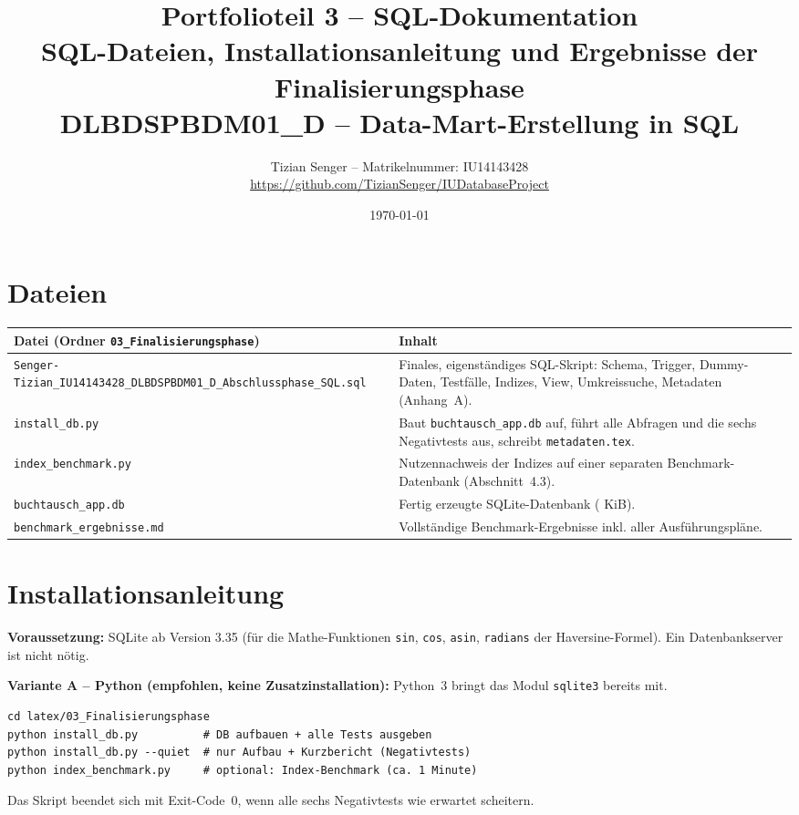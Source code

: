 \documentclass[11pt,a4paper]{article}
\title{\vspace{-1.5cm}\Large\textbf{Portfolioteil 3 -- SQL-Dokumentation}\\[2pt]
\large SQL-Dateien, Installationsanleitung und Ergebnisse der Finalisierungsphase\\[2pt]
\normalsize DLBDSPBDM01\_D -- Data-Mart-Erstellung in SQL}
\author{Tizian Senger -- Matrikelnummer: IU14143428\\
\url{https://github.com/TizianSenger/IUDatabaseProject}}
\date{\today}
\begin{document}
\maketitle
\vspace{-0.8cm}
\tableofcontents

\section{Dateien}
\begin{center}\small
\begin{tabular}{@{}p{}p{}@{}}
\toprule
\textbf{Datei (Ordner \texttt{03\_Finalisierungsphase})} & \textbf{Inhalt} \\
\midrule
\texttt{Senger-Tizian\_IU14143428\_DLBDSPBDM01\_D\_\allowbreak Abschlussphase\_SQL.sql} & Finales, eigenständiges SQL-Skript: Schema, Trigger, Dummy-Daten, Testfälle, Indizes, View, Umkreissuche, Metadaten (Anhang~A). \\
\texttt{install\_db.py} & Baut \texttt{buchtausch\_app.db} auf, führt alle Abfragen und die sechs Negativtests aus, schreibt \texttt{metadaten.tex}. \\
\texttt{index\_benchmark.py} & Nutzennachweis der Indizes auf einer separaten Benchmark-Datenbank (Abschnitt~4.3). \\
\texttt{buchtausch\_app.db} & Fertig erzeugte SQLite-Datenbank (\mdKiB{} KiB). \\
\texttt{benchmark\_ergebnisse.md} & Vollständige Benchmark-Ergebnisse inkl. aller Ausführungspläne. \\
\bottomrule
\end{tabular}
\end{center}

\section{Installationsanleitung}
\textbf{Voraussetzung:} SQLite ab Version 3.35 (für die Mathe-Funktionen \texttt{sin}, \texttt{cos}, \texttt{asin}, \texttt{radians} der Haversine-Formel). Ein Datenbankserver ist nicht nötig.

\textbf{Variante A -- Python (empfohlen, keine Zusatzinstallation):} Python~3 bringt das Modul \texttt{sqlite3} bereits mit.
\begin{lstlisting}[style=shell]
cd latex/03_Finalisierungsphase
python install_db.py          # DB aufbauen + alle Tests ausgeben
python install_db.py --quiet  # nur Aufbau + Kurzbericht (Negativtests)
python index_benchmark.py     # optional: Index-Benchmark (ca. 1 Minute)
\end{lstlisting}
Das Skript beendet sich mit Exit-Code~0, wenn alle sechs Negativtests wie erwartet scheitern.
\end{document}
